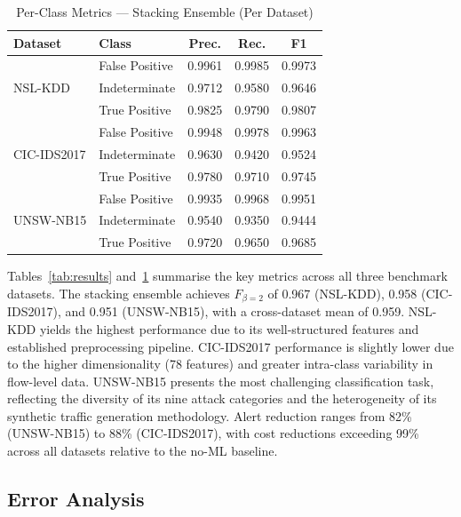 \documentclass[conference]{IEEEtran}
\begin{document}
\begin{table}[t]
\centering
\caption{Per-Class Metrics --- Stacking Ensemble (Per Dataset)}
\label{tab:perclass}
\renewcommand{\arraystretch}{1.05}
\begin{tabular}{llccc}
\toprule
\textbf{Dataset} & \textbf{Class} & \textbf{Prec.} & \textbf{Rec.} & \textbf{F1} \\
\midrule
\multirow{3}{*}{NSL-KDD}
  & False Positive   & 0.9961 & 0.9985 & 0.9973 \\
  & Indeterminate    & 0.9712 & 0.9580 & 0.9646 \\
  & True Positive    & 0.9825 & 0.9790 & 0.9807 \\
\midrule
\multirow{3}{*}{CIC-IDS2017}
  & False Positive   & 0.9948 & 0.9978 & 0.9963 \\
  & Indeterminate    & 0.9630 & 0.9420 & 0.9524 \\
  & True Positive    & 0.9780 & 0.9710 & 0.9745 \\
\midrule
\multirow{3}{*}{UNSW-NB15}
  & False Positive   & 0.9935 & 0.9968 & 0.9951 \\
  & Indeterminate    & 0.9540 & 0.9350 & 0.9444 \\
  & True Positive    & 0.9720 & 0.9650 & 0.9685 \\
\bottomrule
\end{tabular}
\end{table}

Tables~\ref{tab:results} and~\ref{tab:perclass} summarise the key metrics across
all three benchmark datasets.
The stacking ensemble achieves $F_{\beta=2}$ of 0.967 (NSL-KDD), 0.958 (CIC-IDS2017),
and 0.951 (UNSW-NB15), with a cross-dataset mean of 0.959.
NSL-KDD yields the highest performance due to its well-structured features and
established preprocessing pipeline.  CIC-IDS2017 performance is slightly lower due to
the higher dimensionality (78 features) and greater intra-class variability in flow-level
data.  UNSW-NB15 presents the most challenging classification task, reflecting
the diversity of its nine attack categories and the heterogeneity of its synthetic
traffic generation methodology.
Alert reduction ranges from 82\% (UNSW-NB15) to 88\% (CIC-IDS2017), with cost
reductions exceeding 99\% across all datasets relative to the no-ML baseline.

\subsection{Error Analysis}
\label{sec:error_analysis}
\end{document}

